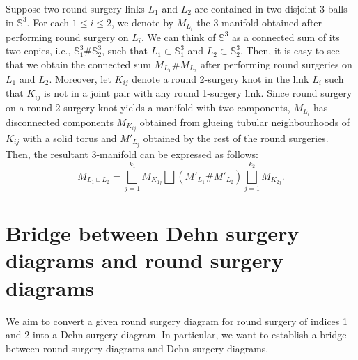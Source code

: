 \documentclass{amsart}
\theoremstyle{plain}
\theoremstyle{remark}
\theoremstyle{definition}
\newcommand{\s}{\mathbb{S}}
\begin{document}
Suppose two round surgery links $L_1$ and $L_2$ are contained in two disjoint $3$-balls in $\s^3$. 
For each $1\leq i\leq 2$, we denote by $M_{L_i}$ the 3-manifold obtained after performing round surgery on $L_i$. 
We can think of $\s^3$ as a connected sum of its two copies, i.e., $\s^3_1\#\s^3_2$, such that $L_1 \subset \s^3_1$ and $L_2\subset \s^3_2$. 
Then, it is easy to see that we obtain the connected sum $M_{L_1}\#M_{L_2}$ after performing round surgeries on $L_1$ and $L_2$. 
Moreover, let $K_{ij}$ denote a round 2-surgery knot in the link $L_i$ such that $K_{ij}$ is not in a joint pair with any round 1-surgery link.
Since round surgery on a round 2-surgery knot yields a manifold with two components, $M_{L_i}$ has disconnected components $M_{K_{ij}}$ obtained from glueing tubular neighbourhoods of $K_{ij}$ with a solid torus and $M'_{L_j}$ obtained by the rest of the round surgeries. 
Then, the resultant 3-manifold can be expressed as follows: 
$$M_{L_1\sqcup L_2}= \bigsqcup_{j=1}^{k_1} M_{K_{1j}} \bigsqcup \left(M'_{L_1} \#M'_{L_2}\right) \bigsqcup_{j=1}^{k_2} M_{K_{2j}}. $$









\section{Bridge between Dehn surgery diagrams and round surgery diagrams}\label{sec: BridgeThmC4}

We aim to convert a given round surgery diagram for round surgery of indices 1 and 2 into a Dehn surgery diagram. 
In particular, we want to establish a bridge between round surgery diagrams and Dehn surgery diagrams.
\end{document}
